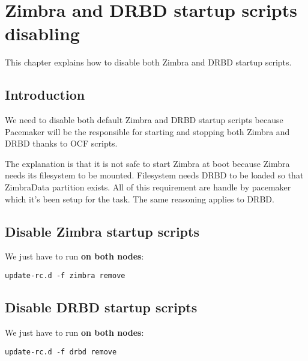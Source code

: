 

\chapter{Zimbra and DRBD startup scripts disabling}
\label{chap:zimbra-drbd-startup-script-disabling}
This chapter explains how to disable both Zimbra and DRBD startup scripts.

\section {Introduction}
We need to disable both default Zimbra and DRBD startup scripts because Pacemaker will be the responsible for starting and stopping both Zimbra and DRBD thanks to OCF scripts.

The explanation is that it is not safe to start Zimbra at boot because Zimbra needs its filesystem to be mounted. Filesystem needs DRBD to be loaded so that ZimbraData partition exists. All of this requirement are handle by pacemaker which it's been setup for the task. The same reasoning applies to DRBD.

\section {Disable Zimbra startup scripts}
We just have to run \textbf{on both nodes}:
\begin{verbatim}
update-rc.d -f zimbra remove
\end{verbatim}

\section {Disable DRBD startup scripts}
We just have to run \textbf{on both nodes}:
\begin{verbatim}
update-rc.d -f drbd remove
\end{verbatim}
